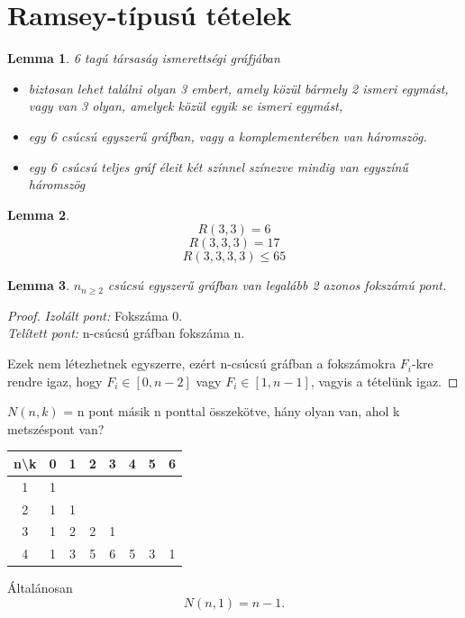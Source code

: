 \documentclass{article}
\newtheorem{lemma}{Lemma}[section]
\begin{document}
\section{Ramsey-típusú tételek}
\begin{lemma}
    6 tagú társaság ismerettségi gráfjában 
    \begin{itemize}
        \item biztosan lehet találni olyan 3 embert, amely közül bármely 2 ismeri egymást, vagy van 3 olyan, amelyek közül egyik se ismeri egymást,
        \item egy 6 csúcsú egyszerű gráfban, vagy a komplementerében van háromszög.
        \item egy 6 csúcsú teljes gráf éleit két színnel színezve mindig van egyszínű háromszög
    \end{itemize}
\end{lemma}

\begin{lemma}
    \[
    R(3,3) = 6
    \]
    \[
    R(3,3,3) = 17
    \]
    \[
    R(3,3,3,3) \le 65
    \]
\end{lemma}

\begin{lemma}
    $n_{n\ge2}$ csúcsú egyszerű gráfban van legalább 2 azonos fokszámú pont.
\end{lemma}
\begin{proof}
    \emph{Izolált pont:} Fokszáma 0.\\
    \emph{Telített pont:} n-csúcsú gráfban fokszáma n.
    
    Ezek nem létezhetnek egyszerre, ezért n-csúcsú gráfban a fokszámokra $F_i$-kre rendre igaz, hogy $F_i \in [0, n-2]$ vagy $F_i \in [1, n-1]$, vagyis a tételünk igaz.
\end{proof}

$N(n,k)$ = n pont másik n ponttal összekötve, hány olyan van, ahol k metszéspont van?

\centering
\begin{tabular}{c|c|c|c|c|c|c|c}
n\textbackslash k & 0 & 1 & 2 & 3 & 4 & 5 & 6\\
\hline
1 & 1 \\
\hline
2 & 1 & 1 \\
\hline
3 & 1 & 2 & 2 & 1 \\
\hline
4 & 1 & 3 & 5 & 6 & 5 & 3 & 1\\
\end{tabular}

\flushleft

Általánosan 
\[
N(n, 1) = n-1.
\]
\end{document}
